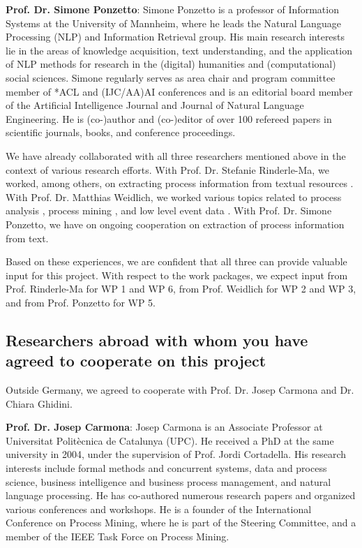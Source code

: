 \textbf{Prof. Dr. Simone Ponzetto}: Simone Ponzetto is a professor of Information Systems at the University of Mannheim, where he leads the Natural Language Processing (NLP) and Information Retrieval group. His main research interests lie in the areas of knowledge acquisition, text understanding, and the application of NLP methods for research in the (digital) humanities and (computational) social sciences. Simone regularly serves as area chair and program committee member of *ACL and (IJC/AA)AI conferences and is an editorial board member of the Artificial Intelligence Journal and Journal of Natural Language Engineering. He is (co-)author and (co-)editor of over 100 refereed papers in scientific journals, books, and conference proceedings.

We have already collaborated with all three researchers mentioned above in the context of various research efforts. 
With Prof. Dr. Stefanie Rinderle-Ma, we worked, among others, on extracting process information from textual resources \cite{winter2020assessing}. 
With Prof. Dr. Matthias Weidlich, we worked various topics related to process analysis \cite{leopold2012probabilistic,weidlich2013predicting}, process mining \cite{van2020partial,fahrenkrog2020pripel}, and low level event data \cite{zhao2021eires,busany2020interval}.
With Prof. Dr. Simone Ponzetto, we have on ongoing cooperation on extraction of process information from text. 

Based on these experiences, we are confident that all three can provide valuable input for this project. With respect to the work packages, we expect input from Prof. Rinderle-Ma for WP 1 and WP 6, from Prof. Weidlich for WP 2 and WP 3, and from Prof. Ponzetto for WP 5.


\subsection{Researchers abroad with whom you have agreed to cooperate on this project}
\label{sec:collab:abroad}

Outside Germany, we agreed to cooperate with Prof. Dr. Josep Carmona and Dr. Chiara Ghidini.

\textbf{Prof. Dr. Josep Carmona}: Josep Carmona is an Associate Professor at Universitat Politècnica de Catalunya (UPC). He received a PhD at the same university in 2004, under the supervision of Prof. Jordi Cortadella. His research interests include formal methods and concurrent systems, data and process science, business intelligence and business process management, and natural language processing. He has co-authored numerous research papers and organized various conferences and workshops. He is a founder of the International Conference on Process Mining, where he is part of the Steering Committee, and a member of the IEEE Task Force on Process Mining.


